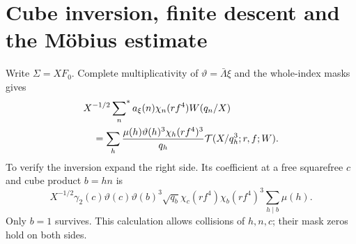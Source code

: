 \documentclass[11pt,a4paper]{article}
\numberwithin{equation}{section}
\theoremstyle{definition}
\theoremstyle{remark}
\newcommand{\sfstar}{\sideset{}{^*}\sum}
\begin{document}
\section{Cube inversion, finite descent and the M\"obius estimate}\label{sec:descent}
Write $\Sigma=XF_0$. Complete multiplicativity of $\vartheta=\bar\Lambda\xi$ and the whole-index masks gives
\begin{align}\label{eq:cube}
 &X^{-1/2}\sfstar_n a_\xi(n)\chi_n(rf^4)W(q_n/X)\notag\\
 &\quad=\sum_h\frac{\mu(h)\vartheta(h)^3\chi_h(rf^4)^3}{q_h}
                       \mathcal T(X/q_h^3;r,f;W).
\end{align}
To verify the inversion expand the right side. Its coefficient at a free squarefree $c$ and cube product $b=hn$ is
\[
 X^{-1/2}\gamma_2(c)\vartheta(c)\vartheta(b)^3\sqrt{q_b}
        \chi_c(rf^4)\chi_b(rf^4)^3
                      \sum_{h\mid b}\mu(h).
\]
Only $b=1$ survives. This calculation allows collisions of $h,n,c$; their mask zeros hold on both sides.
\end{document}

